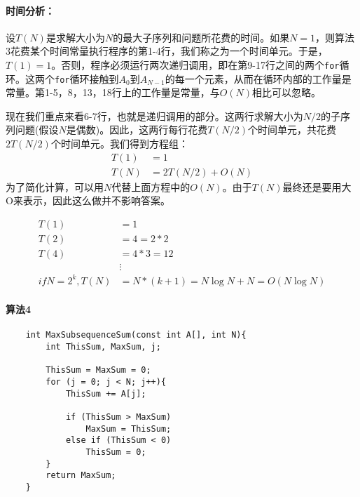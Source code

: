 \documentclass[utf8]{ctexbook}
\begin{document}
\paragraph{时间分析：} 设$T(N)$是求解大小为$N$的最大子序列和问题所花费的时间。如果$N=1$，则算法3花费某个时间常量执行程序的第1-4行，我们称之为一个时间单元。于是，$T(1) = 1$。否则，程序必须运行两次递归调用，即在第9-17行之间的两个\verb|for|循环。这两个\verb|for|循环接触到$A_0$到$A_{N-1}$的每一个元素，从而在循环内部的工作量是常量。第1-5，8，13，18行上的工作量是常量，与$O(N)$相比可以忽略。

现在我们重点来看6-7行，也就是递归调用的部分。这两行求解大小为$N/2$的子序列问题(假设$N$是偶数)。因此，这两行每行花费$T(N/2)$个时间单元，共花费$2T(N/2)$个时间单元。我们得到方程组：
\begin{align*}
    T(1) & =  1 
    \\ T(N) &= 2T(N/2) + O(N)
\end{align*}
为了简化计算，可以用$N$代替上面方程中的$O(N)$。由于$T(N)$最终还是要用大O来表示，因此这么做并不影响答案。 

\begin{align*}
    T(1)& = 1\\
    T(2)& = 4 = 2*2\\
    T(4)&= 4 * 3 = 12 \\
        &\vdots \\
    if N= 2^k, T(N)&= N*(k+1) = N\log N + N = O(N\log N)
\end{align*}

\paragraph{算法4}
\begin{lstlisting}
    int MaxSubsequenceSum(const int A[], int N){
        int ThisSum, MaxSum, j;

        ThisSum = MaxSum = 0;
        for (j = 0; j < N; j++){
            ThisSum += A[j];
            
            if (ThisSum > MaxSum)
                MaxSum = ThisSum;
            else if (ThisSum < 0)
                ThisSum = 0;
        }
        return MaxSum;
    }
\end{lstlisting}
\end{document}
